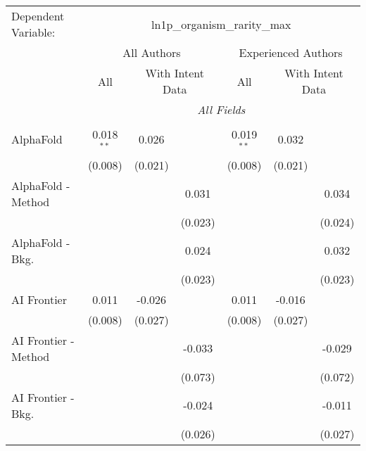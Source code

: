 \begingroup
\centering
\begin{tabular}{lcccccc}
   \tabularnewline \midrule \midrule
   Dependent Variable: & \multicolumn{6}{c}{ln1p\_organism\_rarity\_max}\\
 & \multicolumn{3}{c}{All Authors} & \multicolumn{3}{c}{Experienced Authors} \\
\cmidrule(lr){2-4} \cmidrule(lr){5-7}
 & \multicolumn{1}{c}{All} & \multicolumn{2}{c}{With Intent Data} & \multicolumn{1}{c}{All} & \multicolumn{2}{c}{With Intent Data} \\
\cmidrule(lr){2-2} \cmidrule(lr){3-4} \cmidrule(lr){5-5} \cmidrule(lr){6-7}
 & \multicolumn{6}{c}{\textit{All Fields}} \\ \\
   AlphaFold            & 0.018$^{**}$   & 0.026        &               & 0.019$^{**}$   & 0.032        &   \\   
                        & (0.008)        & (0.021)      &               & (0.008)        & (0.021)      &   \\   
   AlphaFold - Method   &                &              & 0.031         &                &              & 0.034\\   
                        &                &              & (0.023)       &                &              & (0.024)\\   
   AlphaFold - Bkg.     &                &              & 0.024         &                &              & 0.032\\   
                        &                &              & (0.023)       &                &              & (0.023)\\   
   AI Frontier          & 0.011          & -0.026       &               & 0.011          & -0.016       &   \\   
                        & (0.008)        & (0.027)      &               & (0.008)        & (0.027)      &   \\   
   AI Frontier - Method &                &              & -0.033        &                &              & -0.029\\   
                        &                &              & (0.073)       &                &              & (0.072)\\   
   AI Frontier - Bkg.   &                &              & -0.024        &                &              & -0.011\\   
                        &                &              & (0.026)       &                &              & (0.027)\\   

\end{tabular}
